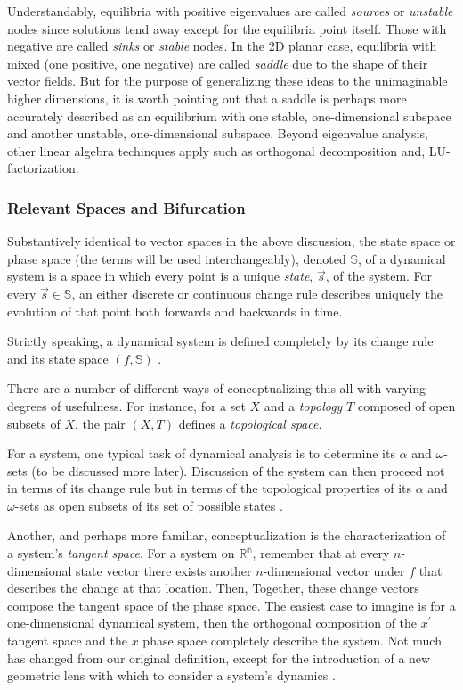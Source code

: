 \documentclass{elsart}
\begin{document}
Understandably, equilibria with positive eigenvalues are called \textit{sources} or \textit{unstable} nodes since solutions tend away except for the equilibria point itself.  Those with negative are called \textit{sinks} or \textit{stable} nodes.  In the 2D planar case, equilibria with mixed (one positive, one negative) are called \textit{saddle} due to the shape of their vector fields.  But for
the purpose of generalizing these ideas to the unimaginable higher dimensions,
it is worth pointing out that a saddle is perhaps more accurately described
as an equilibrium with one stable, one-dimensional subspace and another 
unstable, one-dimensional subspace.  Beyond eigenvalue analysis, other
linear algebra techinques apply such as orthogonal decomposition and,
LU-factorization.

\subsubsection{Relevant Spaces and Bifurcation}
Substantively identical to vector spaces in the above discussion, the
state space or phase space (the terms will be used interchangeably), 
denoted $\mathbb{S}$, of a dynamical system is a space in which 
every point is a unique \textit{state}, $\vec{s}$, of the system.  For every
$\vec{s} \in \mathbb{S}$, an either discrete or continuous change rule describes
uniquely the evolution of that point both forwards and backwards in time.

Strictly speaking, a dynamical system is defined completely by its 
change rule and its state space $(f, \mathbb{S})$ \cite{Hirsch}.  

There are a number of different ways of conceptualizing this all with varying
degrees of usefulness.  For instance, for a set $X$ and a \textit{topology} 
$T$ composed of
open subsets of $X$, the pair $(X,T)$ defines a \textit{topological space}.

For a system, one typical task of dynamical analysis is to determine its
$\alpha$ and $\omega$-sets (to be discussed more later).  Discussion of the
system can then proceed not in terms of its change rule but in terms of the topological properties of its 
$\alpha$ and $\omega$-sets as open subsets of its set of possible states 
\cite{basener}.


Another, and perhaps more familiar, conceptualization is the 
characterization of
a system's \textit{tangent space}.  For a system on $\mathbb{R^{n}}$, remember
that at every $n$-dimensional state vector there exists another $n$-dimensional
vector under $f$ that describes the change at that location.  Then,
Together, these change vectors compose the tangent space of the phase space.
The easiest case to imagine is for a one-dimensional dynamical system, then
the orthogonal composition of the $x^{\prime}$ tangent space and the
$x$ phase space completely describe the system.  Not much has changed from
our original definition, except for the introduction of a new 
geometric lens with which to consider a system's dynamics \cite{arrowsmith}.
\end{document}

